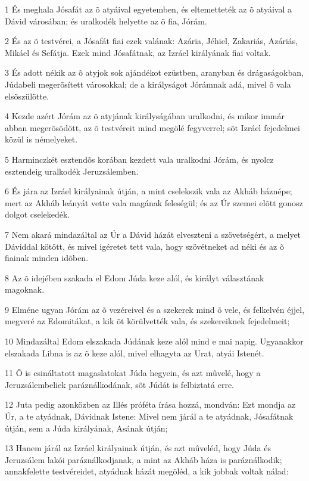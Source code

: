 \par 1 És meghala Jósafát az õ atyáival egyetemben, és eltemetteték az õ atyáival a Dávid városában; és uralkodék helyette az õ fia, Jórám.
\par 2 És az õ testvérei, a Jósafát fiai ezek valának: Azária, Jéhiel, Zakariás, Azáriás, Mikáel és Sefátja. Ezek mind Jósafátnak, az Izráel királyának fiai voltak.
\par 3 És adott nékik az õ atyjok sok ajándékot ezüstben, aranyban és drágaságokban, Júdabeli megerõsített városokkal; de a királyságot Jórámnak adá, mivel õ vala elsõszülötte.
\par 4 Kezde azért Jórám az õ atyjának királyságában uralkodni, és mikor immár abban megerõsödött, az õ testvéreit mind megölé fegyverrel; sõt Izráel fejedelmei közül is némelyeket.
\par 5 Harminczkét esztendõs korában kezdett vala uralkodni Jórám, és nyolcz esztendeig uralkodék Jeruzsálemben.
\par 6 És jára az Izráel királyainak útján, a mint cselekszik vala az Akháb háznépe; mert az Akháb leányát vette vala magának feleségül; és az Úr szemei elõtt gonosz dolgot cselekedék.
\par 7 Nem akará mindazáltal az Úr a Dávid házát elveszteni a szövetségért, a melyet  Dáviddal kötött, és mivel igéretet tett vala, hogy szövétneket ad néki és az õ fiainak minden idõben.
\par 8 Az õ idejében szakada el Edom Júda keze alól, és királyt választának magoknak.
\par 9 Elméne ugyan Jórám az õ vezéreivel és a szekerek mind õ vele, és felkelvén éjjel, megveré az Edomitákat, a kik õt körülvették vala, és szekereiknek fejedelmeit;
\par 10 Mindazáltal Edom elszakada Júdának keze alól mind e mai napig. Ugyanakkor elszakada Libna is az õ keze alól, mivel elhagyta az Urat, atyái Istenét.
\par 11 Õ is csináltatott magaslatokat Júda hegyein, és azt mûvelé, hogy a Jeruzsálembeliek paráználkodának, sõt Júdát is felbiztatá erre.
\par 12 Juta pedig azonközben az Illés próféta írása hozzá, mondván: Ezt mondja az Úr, a te atyádnak, Dávidnak Istene: Mivel nem járál a te atyádnak, Jósafátnak útján, sem a Júda királyának, Asának útján;
\par 13 Hanem járál az Izráel királyainak útján, és azt mûveléd, hogy Júda és Jeruzsálem lakói paráználkodjanak, a mint az Akháb háza is paráználkodik; annakfelette testvéreidet, atyádnak házát megöléd, a kik jobbak voltak nálad:
